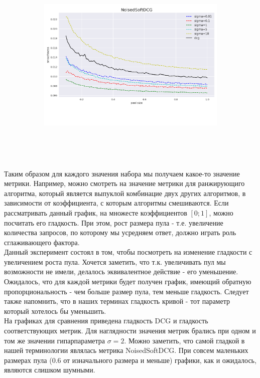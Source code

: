 \documentclass[14pt,a4paper]{amsart}
\theoremstyle{definition}
\theoremstyle{definition}
\begin{document}
\begin{figure}[!h]
    \centering
    \begin{subfigure}{\textwidth}
    \centering
        \includegraphics[height=10cm, width=\textwidth]{noised_decrease_smoothness}
     \end{subfigure}
\end{figure}

Таким образом для каждого значения набора мы получаем какое-то значение метрики. Например, можно смотреть на значение метрики для ранжирующиго алгоритма, который является выпуклой комбинацие двух других алгоритмов, в зависимости от коэффициента, с которым алгоритмы смешиваются. Если рассматривать данный график, на множесте коэффициентов $[0;1]$, можно посчитать его гладкость. При этом, рост размера пула - т.е. увеличение количества запросов, по которому мы усредняем ответ, должно играть роль сглаживающего фактора. \\

Данный эксперимент состоял в том, чтобы посмотреть на изменение гладкости с увеличением роста пула. Хочется заметить, что т.к. увеличивать пул мы возможности не имели, делалось эквивалентное действие - его уменьшение. Ожидалось, что для каждой метрики будет получен график, имеющий обратную пропорциональность - чем больше размер пула, тем меньше гладкость. Следует также напомнить, что в наших терминах гладкость кривой - тот параметр который хотелось бы уменьшить.\\

На графиках для сравнения приведена гладкость DCG и гладкость соответствующих метрик. Для наглядности значения метрик брались при одном и том же значении гипарпараметра $\sigma = 2$. Можно заметить, что самой гладкой в нашей терминологии являлась метрика NoisedSoftDCG. При совсем маленьких размерах пула (0.6 от изначального размера и меньше) графики, как и ожидалось, являются слишком шумными.
\end{document}
